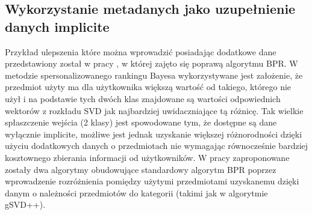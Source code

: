 \documentclass{pracamgr}
\begin{document}
   \subsection{Wykorzystanie metadanych jako uzupełnienie danych implicite}
    Przykład ulepszenia które można wprowadzić posiadając dodatkowe dane przedstawiony został w pracy \cite{191},
    w której zajęto się poprawą algorytmu BPR.\newline
    W metodzie spersonalizowanego rankingu Bayesa wykorzystywane jest założenie, że przedmiot użyty ma dla użytkownika większą wartość od takiego,
    którego nie użył i na podstawie tych dwóch klas znajdowane są wartości odpowiednich wektorów z rozkładu SVD jak najbardziej uwidaczniające tą różnicę.
    Tak wielkie spłaszczenie wejścia (2 klasy) jest spowodowane tym, że dostępne są dane wyłącznie implicite,
    możliwe jest jednak uzyskanie większej różnorodności dzięki użyciu dodatkowych danych o przedmiotach nie wymagając równocześnie bardziej kosztownego
    zbierania informacji od użytkowników.
    W pracy \cite{191} zaproponowane zostały dwa algorytmy obudowujące standardowy algorytm BPR poprzez wprowadzenie rozróżnienia pomiędzy użytymi przedmiotami
    uzyskanemu dzięki danym o należności przedmiotów do kategorii (takimi jak w algorytmie gSVD++).
\end{document}
